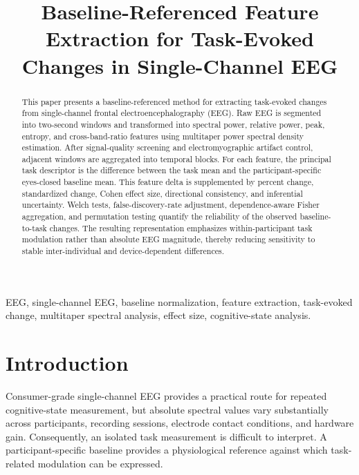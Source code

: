 \documentclass[conference]{IEEEtran}
\begin{document}
\title{Baseline-Referenced Feature Extraction for Task-Evoked Changes in Single-Channel EEG}

\author{
}

\maketitle

\begin{abstract}
This paper presents a baseline-referenced method for extracting task-evoked changes from single-channel frontal electroencephalography (EEG). Raw EEG is segmented into two-second windows and transformed into spectral power, relative power, peak, entropy, and cross-band-ratio features using multitaper power spectral density estimation. After signal-quality screening and electromyographic artifact control, adjacent windows are aggregated into temporal blocks. For each feature, the principal task descriptor is the difference between the task mean and the participant-specific eyes-closed baseline mean. This feature delta is supplemented by percent change, standardized change, Cohen effect size, directional consistency, and inferential uncertainty. Welch tests, false-discovery-rate adjustment, dependence-aware Fisher aggregation, and permutation testing quantify the reliability of the observed baseline-to-task changes. The resulting representation emphasizes within-participant task modulation rather than absolute EEG magnitude, thereby reducing sensitivity to stable inter-individual and device-dependent differences.
\end{abstract}

\begin{IEEEkeywords}
EEG, single-channel EEG, baseline normalization, feature extraction, task-evoked change, multitaper spectral analysis, effect size, cognitive-state analysis.
\end{IEEEkeywords}

\section{Introduction}
Consumer-grade single-channel EEG provides a practical route for repeated cognitive-state measurement, but absolute spectral values vary substantially across participants, recording sessions, electrode contact conditions, and hardware gain. Consequently, an isolated task measurement is difficult to interpret. A participant-specific baseline provides a physiological reference against which task-related modulation can be expressed.
\end{document}
